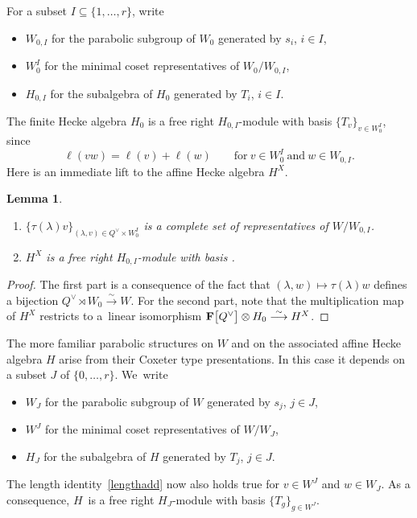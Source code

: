 \documentclass[11pt]{article}
\numberwithin{equation}{section}
\numberwithin{equation}{section}
\newtheorem{Lemma}[Theorem]{Lemma}
\begin{document}
For a subset $I\subseteq\{1,\dots,r\}$, write
\begin{itemize}\itemsep=0pt
\item $W_{0,I}$ for the parabolic subgroup of $W_0$ generated by $s_i$, $i\in I$,
\item $W_0^I$ for the minimal coset representatives of $W_0/W_{0,I}$,
\item $H_{0,I}$ for the subalgebra of $H_0$ generated by $T_i$, $i\in I$.
\end{itemize}
The finite Hecke algebra $H_0$ is a free right $H_{0,I}$-module with basis $\{T_v\}_{v\in W_0^I}$, since
\begin{equation}\label{lengthadd}
\ell(vw)=\ell(v)+\ell(w)\qquad \text{for}\ v\in W_0^I \ \text{and}\ w\in W_{0,I}.
\end{equation}
Here is an immediate lift to the affine Hecke algebra $H^X$.
\begin{Lemma}\label{lemfree}\hfill
\begin{enumerate}\itemsep=0pt
\item[$(1)$]
$\{\tau(\lambda)v\}_{(\lambda,v)\in Q^\vee\times W_0^I}$ is a complete set of representatives of $W/W_{0,I}$.
\item[$(2)$] $H^X$ is a free right $H_{0,I}$-module with
basis .
\end{enumerate}
\end{Lemma}
\begin{proof}
The first part is a consequence of the fact that $(\lambda,w)\mapsto \tau(\lambda)w$ defines a bijection $Q^\vee\rtimes W_0\overset{\sim}{\longrightarrow} W$. For the second part, note that the multiplication map of $H^X$ restricts to
a~linear isomorphism $\mathbf{F}\smash{\bigl[Q^\vee\bigr]}\otimes H_0\overset{\sim}{\longrightarrow} H^X$.
\end{proof}

The more familiar parabolic structures on $W$ and on the associated affine Hecke algebra $H$ arise from their Coxeter type presentations. In this case it depends on a subset $J$ of $\{0,\dots,r\}$. We~write
\begin{itemize}\itemsep=0pt
\item $W_{J}$ for the parabolic subgroup of $W$ generated by $s_j$, $j\in J$,
\item $W^J$ for the minimal coset representatives of $W/W_{J}$,
\item $H_{J}$ for the subalgebra of $H$ generated by $T_j$, $j\in J$.
\end{itemize}
The length identity~\eqref{lengthadd} now also holds true for $v\in W^J$ and $w\in W_J$. As a consequence, $H$~is a free right $H_J$-module with basis
$\{T_g\}_{g\in W^J}$.
\end{document}
